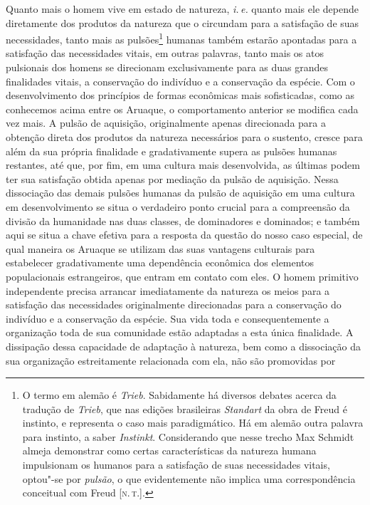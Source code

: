 Quanto mais o homem vive em estado de natureza, \textit{i.\,e.} quanto mais ele
depende diretamente dos produtos da natureza que o circundam para a
satisfação de suas necessidades, tanto mais as pulsões\footnote{O termo em alemão é \textit{Trieb}. Sabidamente há diversos debates
  acerca da tradução de \textit{Trieb}, que nas edições brasileiras
  \textit{Standart} da obra de Freud é instinto, e representa o caso mais
  paradigmático. Há em alemão outra palavra para instinto, a saber
  \textit{Instinkt}. Considerando que nesse trecho Max Schmidt almeja
  demonstrar como certas características da natureza humana impulsionam os
  humanos para a satisfação de suas necessidades vitais, optou"-se por
  \textit{pulsão}, o que evidentemente não implica uma correspondência
  conceitual com Freud {[}\textsc{n.\,t.}{]}.} humanas também
estarão apontadas para a satisfação das necessidades vitais, em outras
palavras, tanto mais os atos pulsionais dos homens se direcionam
exclusivamente para as duas grandes finalidades vitais, a conservação
do indivíduo e a conservação da espécie. Com o desenvolvimento dos
princípios de formas econômicas mais sofisticadas, como as conhecemos
acima entre os Aruaque, o comportamento anterior se modifica cada vez
mais. A pulsão de aquisição, originalmente apenas direcionada para a
obtenção direta dos produtos da natureza necessários para o sustento,
cresce para além da sua própria finalidade e gradativamente supera as
pulsões humanas restantes, até que, por fim, em uma cultura mais
desenvolvida, as últimas podem ter sua satisfação obtida apenas por
mediação da pulsão de aquisição. Nessa dissociação das demais pulsões
humanas da pulsão de aquisição em uma cultura em desenvolvimento se
situa o verdadeiro ponto crucial para a compreensão da divisão da
humanidade nas duas classes, de dominadores e dominados; e também aqui
se situa a chave efetiva para a resposta da questão do nosso caso
especial, de qual maneira os Aruaque se utilizam das suas vantagens
culturais para estabelecer gradativamente uma dependência econômica
dos elementos populacionais estrangeiros, que entram em contato com
eles. O homem primitivo independente precisa arrancar imediatamente da
natureza os meios para a satisfação das necessidades originalmente
direcionadas para a conservação do indivíduo e a conservação da
espécie. Sua vida toda e consequentemente a organização toda de sua
comunidade estão adaptadas a esta única finalidade. A dissipação dessa
capacidade de adaptação à natureza, bem como a dissociação da sua
organização estreitamente relacionada com ela, não são promovidas por
